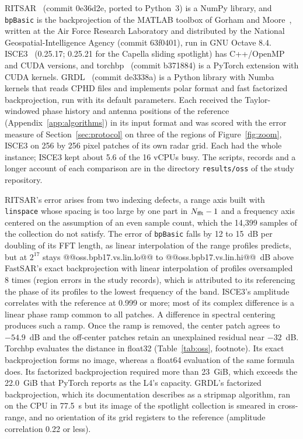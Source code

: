 \documentclass[11pt]{article}
\begin{document}
RITSAR~\cite{ritsar} (commit 0e36d2e, ported to Python~3) is a NumPy library, and \texttt{bpBasic} is the backprojection of the MATLAB toolbox of Gorham and Moore~\cite{gorham2010}, written at the Air Force Research Laboratory and distributed by the National Geospatial-Intelligence Agency (commit 63f0401), run in GNU Octave 8.4. ISCE3~\cite{isce3} (0.25.17; 0.25.21 for the Capella sliding spotlight) has C++/OpenMP and CUDA versions, and torchbp~\cite{torchbp} (commit b371884) is a PyTorch extension with CUDA kernels. GRDL~\cite{grdl} (commit de3338a) is a Python library with Numba kernels that reads CPHD files and implements polar format and fast factorized backprojection, run with its default parameters. Each received the Taylor-windowed phase history and antenna positions of the reference (Appendix~\ref{app:algorithms}) in its input format and was scored with the error measure of Section~\ref{sec:protocol} on three of the regions of Figure~\ref{fig:zoom}, ISCE3 on 256 by 256 pixel patches of its own radar grid. Each had the whole instance; ISCE3 kept about 5.6 of the 16 vCPUs busy. The scripts, records and a longer account of each comparison are in the directory \texttt{results/oss} of the study repository.

RITSAR's error arises from two indexing defects, a range axis built with \texttt{linspace} whose spacing is too large by one part in $N_{\rm fft}-1$ and a frequency axis centered on the assumption of an even sample count, which the 14{,}399 samples of the collection do not satisfy. The error of \texttt{bpBasic} falls by 12 to 15~dB per doubling of its FFT length, as linear interpolation of the range profiles predicts, but at $2^{17}$ stays @@oss.bpb17.vs.lin.lo@@ to @@oss.bpb17.vs.lin.hi@@~dB above FastSAR's exact backprojection with linear interpolation of profiles oversampled 8 times (region errors in the study records), which is attributed to its referencing the phase of its profiles to the lowest frequency of the band. ISCE3's amplitude correlates with the reference at 0.999 or more; most of its complex difference is a linear phase ramp common to all patches. A difference in spectral centering produces such a ramp. Once the ramp is removed, the center patch agrees to $-54.9$~dB and the off-center patches retain an unexplained residual near $-32$~dB. Torchbp evaluates the distance in float32 (Table~\ref{tab:oss}, footnote). Its exact backprojection forms no image, whereas a float64 evaluation of the same formula does. Its factorized backprojection required more than 23~GiB, which exceeds the 22.0~GiB that PyTorch reports as the L4's capacity. GRDL's factorized backprojection, which its documentation describes as a stripmap algorithm, ran on the CPU in 77.5~s but its image of the spotlight collection is smeared in cross-range, and no orientation of its grid registers to the reference (amplitude correlation 0.22 or less).
\end{document}
